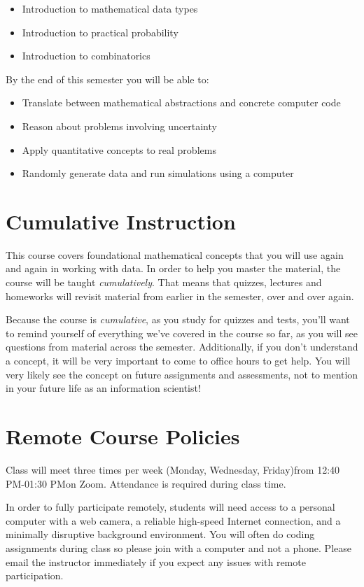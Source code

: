 \documentclass[10pt]{memoir}
\def\mymeetingdays{Monday, Wednesday, Friday}
\def\mymeetingtimes{12:40 PM-01:30 PM}
\begin{document}
\begin{itemize}
\item Introduction to mathematical data types
\item Introduction to practical probability
\item Introduction to combinatorics
\end{itemize}

By the end of this semester you will be able to:
\begin{itemize}
\item Translate between mathematical abstractions and concrete computer code
\item Reason about problems involving uncertainty
\item Apply quantitative concepts to real problems
\item Randomly generate data and run simulations using a computer
\end{itemize}

\section{\textbf{Cumulative Instruction}}

This course covers foundational mathematical concepts that you will use again and again in working with data. In order to help you master the material, the course will be taught \textit{cumulatively}. That means that quizzes, lectures and homeworks will revisit material from earlier in the semester, over and over again. 

Because the course is \textit{cumulative}, as you study for quizzes and tests, you'll want to remind yourself of everything we've covered in the course so far, as you will see questions from material across the semester. Additionally, if you don't understand a concept, it will be very important to come to office hours to get help. You will very likely see the concept on future assignments and assessments, not to mention in your future life as an information scientist!

\section{\textbf{Remote Course Policies}}
Class will meet three times per week (\mymeetingdays)\space from \mymeetingtimes\space on Zoom. {Attendance is required during class time.}   
 
In order to fully participate remotely, students will need access to a personal computer with a web camera, a reliable high-speed Internet connection, and a minimally disruptive background environment. {You will often do coding assignments during class so please join with a computer and not a phone}. Please email the instructor immediately if you expect any issues with remote participation.
\end{document}
